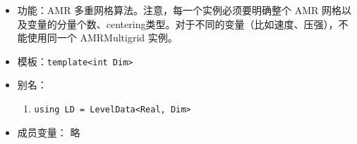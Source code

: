 \documentclass[cn, bibend=bibtex]{elegantpaper}
\theoremstyle{plain}
\begin{document}
\begin{itemize}
  \item 功能：AMR 多重网格算法。注意，每一个实例必须要明确整个 AMR 网格以及变量的分量个数、centering类型。对于不同的变量（比如速度、压强），不能使用同一个 AMRMultigrid 实例。
  \item 模板：\lstinline|template<int Dim>|
  \item 别名：
  \begin{enumerate}
      \item \lstinline|using LD = LevelData<Real, Dim>|
  \end{enumerate}
  \item 成员变量： 略
      
      
      
      








\end{itemize}
\end{document}
